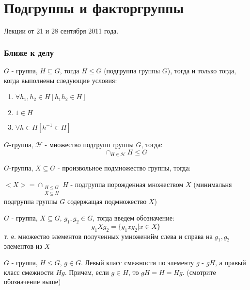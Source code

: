 \chapter{Подгруппы и факторгруппы}

Лекции от 21 и 28 сентября 2011 года.

\subsection{Ближе к делу}

\begin{Def}
$G$ - группа, $H \subseteq G$, тогда $H \le G$ (подгруппа группы $G$), тогда и только тогда, когда выполнены следующие условия:
\begin{enumerate}
\item $\forall h_1, h_2 \in H \left[h_1h_2 \in H\right]$

\item $1 \in H$

\item $\forall h \in H \left[h^{-1} \in H\right]$
\end{enumerate}
\end{Def}

\begin{Th}
$G$-группа, $\mathscr{H}$ - множество подгрупп группы $G$, тогда:
\[
	\cap_{H \in \mathscr{H}} H \le G
\]
\end{Th}

\begin{Def}
$G$-группа, $X \subseteq G$ - произвольное подмножество группы, тогда:

$<X> = \cap_{\substack{H \le G \\ X \subseteq H}} H$ - подгруппа порожденная множеством $X$ (минимальня подгруппа группы $G$ содержащая подмножество $X$)
\end{Def}

\begin{Def}
$G$ - группа, $X \subseteq G$, $g_1,g_2 \in G$, тогда введем обозначение:
\[
	g_1 X g_2 = \{g_1 x g_2 | x \in X\}
\]
т. е. множество элементов полученных умноженийм слева и справа на $g_1,g_2$ элементов из $X$
\end{Def}

\begin{Def}
$G$ - группа, $H \le G$, $g \in G$. Левый класс смежности по элементу $g$ - $gH$, а правый класс смежности $Hg$. Причем, если $g \in H$, то $gH = H = Hg$. (смотрите обозначение выше)
\end{Def}

